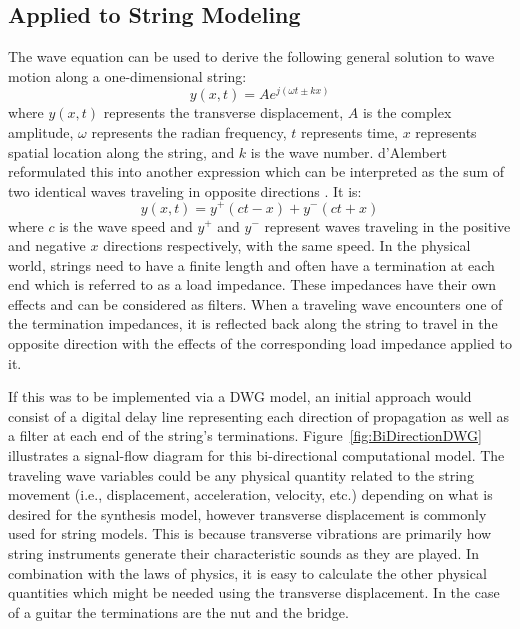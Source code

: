 \documentclass[main.tex]{subfiles}
\begin{document}
\subsection{Applied to String Modeling}
The wave equation can be used to derive the following general solution to wave motion along a one-dimensional string:
\begin{equation}
    y(x,t) = Ae^{j\left(\omega t \pm k x\right)}
\end{equation}
where $y(x,t)$ represents the transverse displacement, $A$ is the complex amplitude, $\omega$ represents the radian frequency, $t$ represents time, $x$ represents spatial location along the string, and $k$ is the wave number. d'Alembert reformulated this into another expression which can be interpreted as the sum of two identical waves traveling in opposite directions . It is:
\begin{equation}
    y(x,t) = y^{+}(ct - x) + y^{-}(ct + x)
\end{equation}
where $c$ is the wave speed and $y^+$ and $y^-$ represent waves traveling in the positive and negative $x$ directions respectively, with the same speed. In the physical world, strings need to have a finite length and often have a termination at each end which is referred to as a load impedance. These impedances have their own effects and can be considered as filters. When a traveling wave encounters one of the termination impedances, it is reflected back along the string to travel in the opposite direction with the effects of the corresponding load impedance applied to it. 

If this was to be implemented via a DWG model, an initial approach would consist of a digital delay line representing each direction of propagation as well as a filter at each end of the string's terminations. Figure~\ref{fig:BiDirectionDWG} illustrates a signal-flow diagram for this bi-directional computational model. The traveling wave variables could be any physical quantity related to the string movement (i.e., displacement, acceleration, velocity, etc.) depending on what is desired for the synthesis model, however transverse displacement is commonly used for string models. This is because transverse vibrations are primarily how string instruments generate their characteristic sounds as they are played. In combination with the laws of physics, it is easy to calculate the other physical quantities which might be needed using the transverse displacement. In the case of a guitar the terminations are the nut and the bridge.
\end{document}

